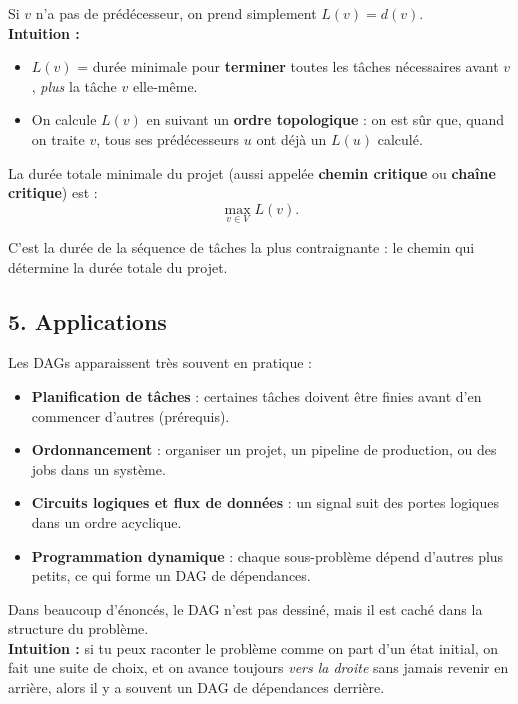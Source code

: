 Si $v$ n’a pas de prédécesseur, on prend simplement $L(v) = d(v)$. \\

\textbf{Intuition :}
\begin{itemize}
    \item $L(v)$ = durée minimale pour \textbf{terminer} toutes les tâches nécessaires avant $v$, \emph{plus} la tâche $v$ elle-même.
    \item On calcule $L(v)$ en suivant un \textbf{ordre topologique} : on est sûr que, quand on traite $v$, tous ses prédécesseurs $u$ ont déjà un $L(u)$ calculé. \\
\end{itemize}

La durée totale minimale du projet (aussi appelée \textbf{chemin critique} ou \textbf{chaîne critique}) est :
\[
\max_{v \in V} L(v).
\]

C’est la durée de la séquence de tâches la plus \og contraignante\fg{} : le chemin qui détermine la durée totale du projet.

\subsection*{5. Applications} 

Les DAGs apparaissent très souvent en pratique :
\begin{itemize}
    \item \textbf{Planification de tâches} : certaines tâches doivent être finies avant d’en commencer d’autres (prérequis).
    \item \textbf{Ordonnancement} : organiser un projet, un pipeline de production, ou des jobs dans un système.
    \item \textbf{Circuits logiques et flux de données} : un signal suit des portes logiques dans un ordre acyclique.
    \item \textbf{Programmation dynamique} : chaque sous-problème dépend d’autres plus petits, ce qui forme un DAG de dépendances. \\
\end{itemize}

Dans beaucoup d’énoncés, le DAG n’est pas dessiné, mais il est \og caché\fg{} dans la structure du problème. \\

\textbf{Intuition :} si tu peux raconter le problème comme
\og on part d’un état initial, on fait une suite de choix, et on avance toujours \emph{vers la droite} sans jamais revenir en arrière\fg{}, alors il y a souvent un DAG de dépendances derrière.


